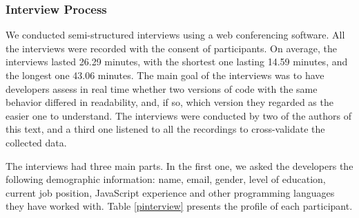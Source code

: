\subsubsection{Interview Process}

We conducted semi-structured interviews using a web conferencing software. All the interviews were recorded with the consent of participants. On average, the interviews lasted 26.29 minutes, with the shortest one lasting 14.59 minutes, and the longest one 43.06 minutes. The main goal of the interviews was to have developers assess in real time whether two versions of code with the same behavior differed in readability, and, if so, which version they regarded as the easier one to understand. The interviews were conducted by two of the authors of this text, and a third one listened to all the recordings to cross-validate the collected data.


The interviews had three main parts. In the first one, we asked the developers the following demographic information: name, email, gender, level of education, current job position, JavaScript experience and other programming languages they have worked with. Table \ref{pinterview} presents the profile of each participant.

